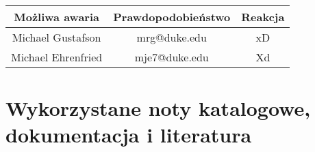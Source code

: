 \documentclass[a4paper,12pt,twoside]{article}
\theoremstyle{plain}
\theoremstyle{definition}
\theoremstyle{remark}
\begin{document}
\begin{center}
	\begin{tabular}{|c|c|c|}\hline
		Możliwa awaria & Prawdopodobieństwo & Reakcja\\ \hline\hline %
		Michael Gustafson & mrg@duke.edu& xD\\ \hline
		Michael Ehrenfried & mje7@duke.edu &Xd\\ \hline
	\end{tabular}
\end{center}
\section{Wykorzystane noty katalogowe, dokumentacja i literatura}
\end{document}
